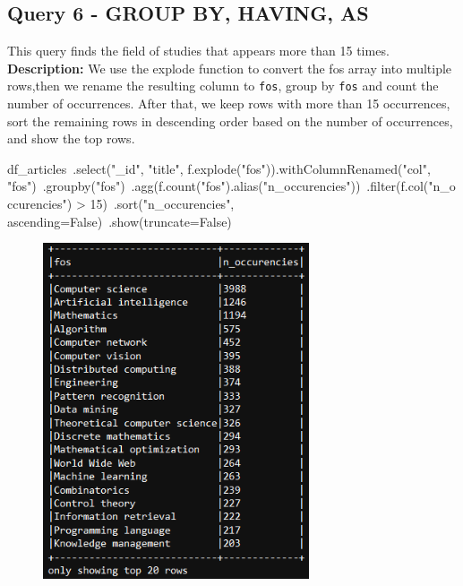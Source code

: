 \documentclass{Configuration_Files/PoliMi3i_thesis}
\begin{document}
\subsection{Query 6 - GROUP BY, HAVING, AS}
This query finds the field of studies that appears more than 15 times.\newline
\textbf{Description:} We use the explode function to convert the fos array into multiple rows,then we rename the resulting column to
\verb |fos|, group by \verb|fos| and count the number of occurrences.\newline
After that, we keep rows with more than 15 occurrences, sort the remaining rows in descending order based on the number of occurrences,
and show the top rows.\newline
\begin{python}
df_articles\
    .select("_id", "title", f.explode("fos")).withColumnRenamed("col", "fos")\
    .groupby("fos")\
    .agg(f.count("fos").alias("n_occurencies"))\
    .filter(f.col("n_occurencies") > 15)\
    .sort("n_occurencies", ascending=False)\
    .show(truncate=False)
\end{python}
\begin{figure}[H]
\centering
\includegraphics[width=0.7\textwidth]{query/spark_q6.PNG}
\label{fig:query6}
\end{figure}
\end{document}
